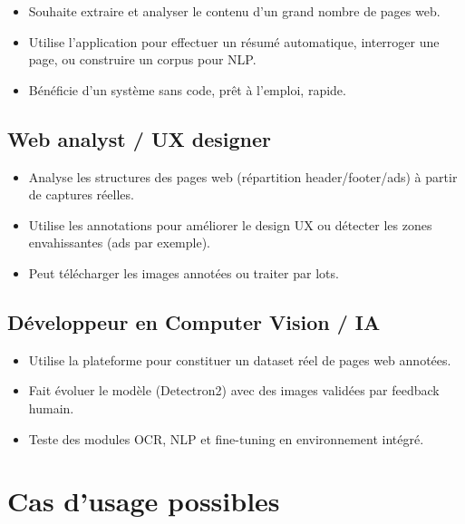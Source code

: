 \documentclass[12pt,a4paper]{report}
\begin{document}
\begin{itemize}
\item Souhaite extraire et analyser le contenu d'un grand nombre de pages web.
\item Utilise l'application pour effectuer un résumé automatique, interroger une page, ou construire un corpus pour NLP.
\item Bénéficie d'un système sans code, prêt à l'emploi, rapide.
\end{itemize}

\subsection{Web analyst / UX designer}

\begin{itemize}
\item Analyse les structures des pages web (répartition header/footer/ads) à partir de captures réelles.
\item Utilise les annotations pour améliorer le design UX ou détecter les zones envahissantes (ads par exemple).
\item Peut télécharger les images annotées ou traiter par lots.
\end{itemize}

\subsection{Développeur en Computer Vision / IA}

\begin{itemize}
\item Utilise la plateforme pour constituer un dataset réel de pages web annotées.
\item Fait évoluer le modèle (Detectron2) avec des images validées par feedback humain.
\item Teste des modules OCR, NLP et fine-tuning en environnement intégré.
\end{itemize}

\section{Cas d'usage possibles}
\end{document}
